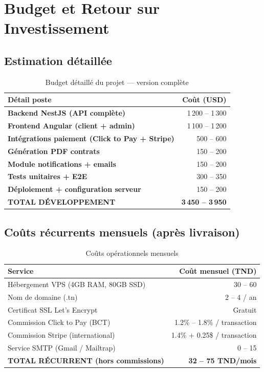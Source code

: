\documentclass[12pt, a4paper]{article}
\begin{document}
\section{Budget et Retour sur Investissement}

\subsection{Estimation détaillée}

\begin{table}[h]
  \centering
  \begin{tabular}{l r}
    \toprule
    \textbf{Détail poste} & \textbf{Coût (USD)} \\
    \midrule
    \textbf{Backend NestJS (API complète)} & 1\,200 -- 1\,300 \\
    \textbf{Frontend Angular (client + admin)} & 1\,100 -- 1\,200 \\
    \textbf{Intégrations paiement (Click to Pay + Stripe)} & 500 -- 600 \\
    \textbf{Génération PDF contrats} & 150 -- 200 \\
    \textbf{Module notifications + emails} & 150 -- 200 \\
    \textbf{Tests unitaires + E2E} & 300 -- 350 \\
    \textbf{Déploiement + configuration serveur} & 150 -- 200 \\
    \midrule
    \textbf{\large TOTAL DÉVELOPPEMENT} & \textbf{\large 3\,450 -- 3\,950} \\
    \bottomrule
  \end{tabular}
  \caption{Budget détaillé du projet — version complète}
\end{table}

\subsection{Coûts récurrents mensuels (après livraison)}

\begin{table}[h]
  \centering
  \begin{tabular}{l r}
    \toprule
    \textbf{Service} & \textbf{Coût mensuel (TND)} \\
    \midrule
    Hébergement VPS (4GB RAM, 80GB SSD) & 30 -- 60 \\
    Nom de domaine (.tn) & 2 -- 4 / an \\
    Certificat SSL Let's Encrypt & Gratuit \\
    Commission Click to Pay (BCT) & 1.2\% -- 1.8\% / transaction \\
    Commission Stripe (international) & 1.4\% + 0.25\$ / transaction \\
    Service SMTP (Gmail / Mailtrap) & 0 -- 15 \\
    \midrule
    \textbf{TOTAL RÉCURRENT (hors commissions)} & \textbf{~32 -- 75 TND/mois} \\
    \bottomrule
  \end{tabular}
  \caption{Coûts opérationnels mensuels}
\end{table}
\end{document}

